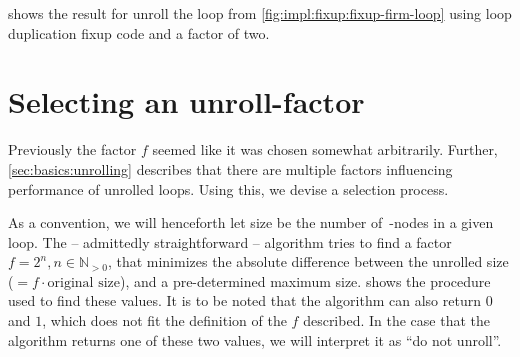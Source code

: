  shows the result for unroll the loop from \cref{fig:impl:fixup:fixup-firm-loop} using loop duplication fixup code and a factor of two.








\newpage

\section{Selecting an unroll-factor}\label{sec:impl:sel-factor}

Previously the factor $f$ seemed like it was chosen somewhat arbitrarily.
Further, \cref{sec:basics:unrolling} describes that there are multiple factors influencing performance of unrolled loops.
Using this, we devise a selection process.

As a convention, we will henceforth let size be the number of~\libFIRM-nodes in a given loop.
The -- admittedly straightforward -- algorithm tries to find a factor $f = 2^n, n \in \mathbb{N}_{>0}$, that minimizes the absolute difference between the unrolled size ($= f \cdot \text{original size}$), and a pre-determined maximum size.
 shows the procedure used to find these values.
It is to be noted that the algorithm can also return $0$ and $1$, which does not fit the definition of the $f$ described.
In the case that the algorithm returns one of these two values, we will interpret it as ``do not unroll''.

